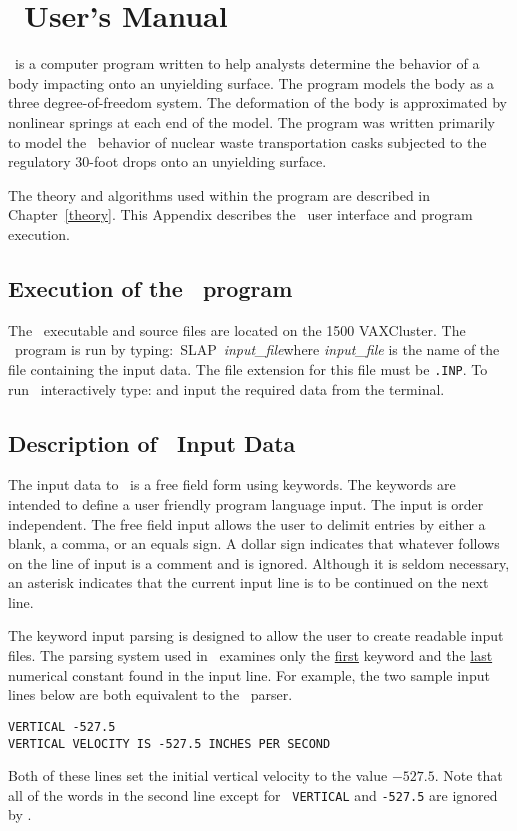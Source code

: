 \chapter{\SLAP\ User's Manual}

\SLAP\  is a computer program written to help analysts determine the
behavior of a body impacting onto an unyielding surface.  The program
models the body as a three degree-of-freedom system.  The deformation of
the body is approximated by nonlinear springs at each end of the model.
The program was written primarily to model the \SLAP\  behavior of
nuclear waste transportation casks subjected to the regulatory 30-foot
drops onto an unyielding surface.

The theory and algorithms used within the program are described in
Chapter~\ref{theory}.  This Appendix describes the \SLAP\ user interface
and program execution.

\section{Execution of the \SLAP\  program}

The \SLAP\ executable and source files are located on the 1500
VAXCluster. The \SLAP\ program is run by typing:\hbox{\ {\sf SLAP
}{\em input\_file}}\quad where {\em input\_file} is the name of the
file containing the input data.  The file extension for this file must
be {\tt .INP}. To run \SLAP\ interactively type:\quad
and input the required data from the terminal.

\section{Description of \SLAP\  Input Data}

The input data to \SLAP\ is a free field form using keywords.  The
keywords are intended to define a user friendly program language input.
The input is order independent.  The free field input allows the user to
delimit entries by either a blank, a comma, or an equals sign.  A dollar
sign indicates that whatever follows on the line of input is a comment
and is ignored.  Although it is seldom necessary, an asterisk indicates
that the current input line is to be continued on the next line.

The keyword input parsing is designed to allow the user to create
readable input files.  The parsing system used in \SLAP\ examines only
the \underline{first} keyword and the \underline{last} numerical
constant found in the input line.  For example, the two sample input
lines below are both equivalent to the \SLAP\ parser.
\begin{verbatim}
VERTICAL -527.5
VERTICAL VELOCITY IS -527.5 INCHES PER SECOND
\end{verbatim}
Both of these lines set the initial vertical velocity to the value
$-527.5$.  Note that all of the words in the second line except for {\tt
VERTICAL} and {\tt -527.5} are ignored by \SLAP.

